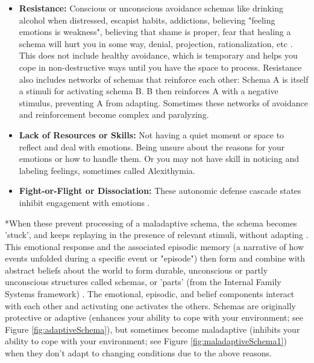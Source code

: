 \documentclass[12pt,letterpaper]{article}
\begin{document}
\begin{itemize}
    \item \textbf{Resistance:} Conscious or unconscious avoidance schemas like drinking alcohol when distressed, escapist habits, addictions, believing "feeling emotions is weakness", believing that shame is proper, fear that healing a schema will hurt you in some way, denial, projection, rationalization, etc \cite{eckerUnlocking}. This does not include healthy avoidance, which is temporary and helps you cope in non-destructive ways until you have the space to process. Resistance also includes networks of schemas that reinforce each other: Schema A is itself a stimuli for activating schema B. B then reinforces A with a negative stimulus, preventing A from adapting. Sometimes these networks of avoidance and reinforcement become complex and paralyzing. 
    \item \textbf{Lack of Resources or Skills:} Not having a quiet moment or space to reflect and deal with emotions. Being unsure about the reasons for your emotions or how to handle them. Or you may not have skill in noticing and labeling feelings, sometimes called Alexithymia.
    \item \textbf{Fight-or-Flight or Dissociation:} These autonomic defense cascade states inhibit engagement with emotions \cite{razviPSIP}.
\end{itemize}
\label{def:schemas}
*When these prevent processing of a maladaptive schema, the schema becomes 'stuck', and keeps replaying in the presence of relevant stimuli, without adapting \cite{rachmanProcessing,eckerUnlocking}. This emotional response and the associated episodic memory (a narrative of how events unfolded during a specific event or "episode") then form and combine with abstract beliefs about the world to form durable, unconscious or partly unconscious structures called schemas, or 'parts' (from the Internal Family Systems framework) \cite{laneReconsolidation,lesswrongCoherenceTherapy}. The emotional, episodic, and belief components interact with each other and activating one activates the others. Schemas are originally protective or adaptive (enhances your ability to cope with your environment; see Figure \ref{fig:adaptiveSchema}), but sometimes become maladaptive (inhibits your ability to cope with your environment; see Figure \ref{fig:maladaptiveSchema1}) when they don't adapt to changing conditions due to the above reasons.
\end{document}
